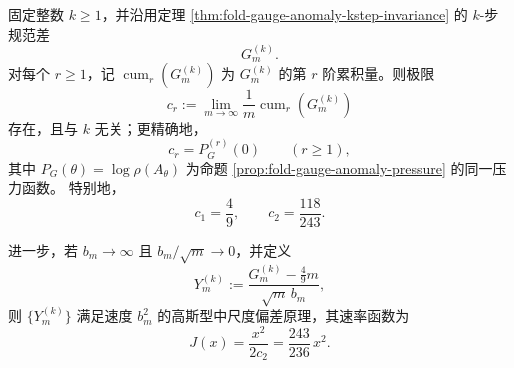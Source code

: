 \begin{theorem}[固定超前位数下规范差的全累积量密度与高斯型中尺度偏差普适性]\label{thm:conclusion-kstep-gauge-cumulant-universality-mdp}
固定整数 \(k\ge 1\)，并沿用定理 \ref{thm:fold-gauge-anomaly-kstep-invariance} 的 \(k\)-步规范差
\[
G_m^{(k)}.
\]
对每个 \(r\ge 1\)，记 \(\operatorname{cum}_r(G_m^{(k)})\) 为 \(G_m^{(k)}\) 的第 \(r\) 阶累积量。则极限
\[
c_r:=\lim_{m\to\infty}\frac{1}{m}\operatorname{cum}_r(G_m^{(k)})
\]
存在，且与 \(k\) 无关；更精确地，
\[
c_r=P_G^{(r)}(0)
\qquad (r\ge 1),
\]
其中 \(P_G(\theta)=\log\rho(A_\theta)\) 为命题 \ref{prop:fold-gauge-anomaly-pressure} 的同一压力函数。
特别地，
\[
c_1=\frac49,
\qquad
c_2=\frac{118}{243}.
\]

进一步，若 \(b_m\to\infty\) 且 \(b_m/\sqrt m\to 0\)，并定义
\[
Y_m^{(k)}:=
\frac{G_m^{(k)}-\frac49 m}{\sqrt m\,b_m},
\]
则 \(\{Y_m^{(k)}\}\) 满足速度 \(b_m^2\) 的高斯型中尺度偏差原理，其速率函数为
\[
J(x)=\frac{x^2}{2c_2}=\frac{243}{236}\,x^2.
\]
\end{theorem}
